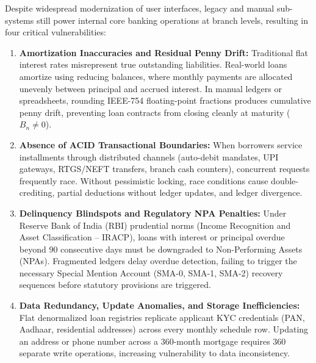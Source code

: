 \documentclass[11pt,a4paper]{report}
\begin{document}
Despite widespread modernization of user interfaces, legacy and manual sub-systems still power internal core banking operations at branch levels, resulting in four critical vulnerabilities:
\begin{enumerate}
    \item \textbf{Amortization Inaccuracies and Residual Penny Drift:} Traditional flat interest rates misrepresent true outstanding liabilities. Real-world loans amortize using reducing balances, where monthly payments are allocated unevenly between principal and accrued interest. In manual ledgers or spreadsheets, rounding IEEE-754 floating-point fractions produces cumulative penny drift, preventing loan contracts from closing cleanly at maturity ($B_n \neq 0$).
    \item \textbf{Absence of ACID Transactional Boundaries:} When borrowers service installments through distributed channels (auto-debit mandates, UPI gateways, RTGS/NEFT transfers, branch cash counters), concurrent requests frequently race. Without pessimistic locking, race conditions cause double-crediting, partial deductions without ledger updates, and ledger divergence.
    \item \textbf{Delinquency Blindspots and Regulatory NPA Penalties:} Under Reserve Bank of India (RBI) prudential norms (Income Recognition and Asset Classification -- IRACP), loans with interest or principal overdue beyond 90 consecutive days must be downgraded to Non-Performing Assets (NPAs). Fragmented ledgers delay overdue detection, failing to trigger the necessary Special Mention Account (SMA-0, SMA-1, SMA-2) recovery sequences before statutory provisions are triggered.
    \item \textbf{Data Redundancy, Update Anomalies, and Storage Inefficiencies:} Flat denormalized loan registries replicate applicant KYC credentials (PAN, Aadhaar, residential addresses) across every monthly schedule row. Updating an address or phone number across a 360-month mortgage requires 360 separate write operations, increasing vulnerability to data inconsistency.
\end{enumerate}
\end{document}
